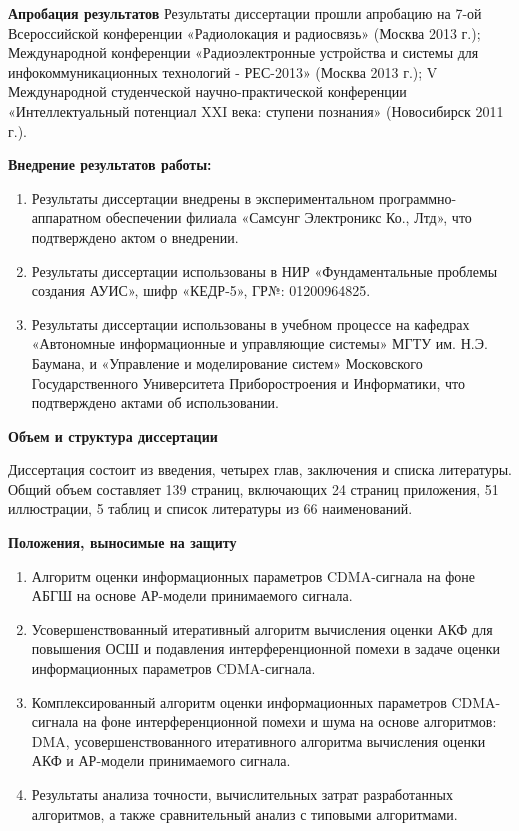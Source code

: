 {\bf{Апробация результатов}}
Результаты диссертации прошли апробацию на 7-ой Всероссийской конференции «Радиолокация и радиосвязь» (Москва 2013 г.); Международной конференции «Радиоэлектронные устройства и системы для инфокоммуникационных технологий - РЕС-2013» (Москва 2013 г.); V Международной студенческой научно-практической конференции «Интеллектуальный потенциал XXI века: ступени познания» (Новосибирск 2011 г.).

{\bf{Внедрение результатов работы:}}
\begin{enumerate}
	\item {Результаты диссертации внедрены в экспериментальном программно-аппаратном обеспечении филиала «Самсунг Электроникс Ко., Лтд», что подтверждено актом о внедрении.}
	\item {Результаты диссертации использованы в НИР «Фундаментальные проблемы создания АУИС», шифр «КЕДР-5», ГР№: 01200964825.}
	\item {Результаты диссертации использованы в учебном процессе на кафедрах «Автономные информационные и управляющие системы» МГТУ им. Н.Э. Баумана, и
		«Управление и моделирование систем» Московского Государственного Университета Приборостроения и Информатики, что подтверждено актами об использовании.}
\end{enumerate}

{\bf{Объем и структура диссертации}}

Диссертация состоит из введения, четырех глав, заключения и списка литературы. Общий объем составляет 139 страниц, включающих 24 страниц приложения, 51 иллюстрации,
5 таблиц и список литературы из 66 наименований.

{\bf{Положения, выносимые на защиту}}
\begin{enumerate}
	\item {Алгоритм оценки информационных параметров CDMA-сигнала на фоне АБГШ на основе АР-модели принимаемого сигнала.}
	\item {Усовершенствованный итеративный алгоритм вычисления оценки АКФ для повышения ОСШ и подавления интерференционной помехи в задаче оценки информационных параметров CDMA-сигнала.}
	\item {Комплексированный алгоритм оценки информационных параметров CDMA-сигнала на фоне интерференционной помехи и шума на основе алгоритмов: DMA, усовершенствованного итеративного алгоритма вычисления оценки АКФ и АР-модели принимаемого сигнала.}
	\item {Результаты анализа точности, вычислительных затрат разработанных алгоритмов, а также сравнительный анализ с типовыми алгоритмами.}
\end{enumerate}

\clearpage
